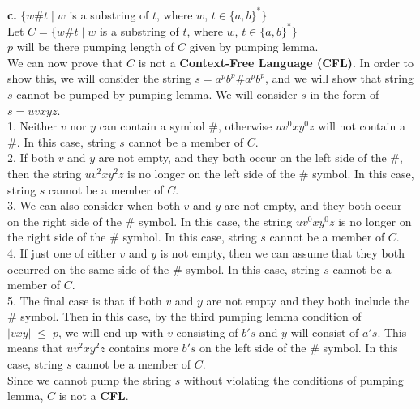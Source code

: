 \documentclass[12pt]{article}
\begin{document}
\textbf{c.} $\{ w \# t \; | \; w$ is a substring of $t$, where $w$, $t \in \{a, b\}^* \} $ \\

Let $C = \{ w \# t \; | \; w$ is a substring of $t$, where $w$, $t \in \{a, b\}^* \}$ \\
$p$ will be there pumping length of $C$ given by pumping lemma. \\

We can now prove that $C$ is not a \textbf{Context-Free Language (CFL)}.
In order to show this, we will consider the string $s = a^p b^p \# a^p b^p $,
and we will show that string $s$ cannot be pumped by pumping lemma. We will
consider $s$ in the form of $s = uvxyz$. \\

1. Neither $v$ nor $y$ can contain a symbol $\#$, otherwise $u v^0 x y^0 z$
will not contain a $\#$. In this case, string $s$ cannot be a member of $C$. \\

2. If both $v$ and $y$ are not empty, and they both occur on the left side of the
$\#$, then the string $u v^2 x y^2 z$ is no longer on the left side of the
$\#$ symbol. In this case, string $s$ cannot be a member of $C$. \\

3. We can also consider when both $v$ and $y$ are not empty, and they both occur
on the right side of the $\#$ symbol. In this case, the string $u v^0 x y^0 z$
is no longer on the right side of the $\#$ symbol. In this case, string $s$
cannot be a member of $C$. \\

4. If just one of either $v$ and $y$ is not empty, then we can assume that they
both occurred on the same side of the $\#$ symbol. In this case, string $s$
cannot be a member of $C$. \\

5. The final case is that if both $v$ and $y$ are not empty and they both
include the $\#$ symbol. Then in this case, by the third pumping lemma
condition of $|vxy| \; \le \; p$, we will end up with $v$ consisting of
$b's$ and $y$ will consist of $a's$. This means that $u v^2 x y^2 z$ contains
more $b's$ on the left side of the $\#$ symbol. In this case, string $s$
cannot be a member of $C$. \\

Since we cannot pump the string $s$ without violating the conditions of
pumping lemma, $C$ is not a \textbf{CFL}. \\
\end{document}
